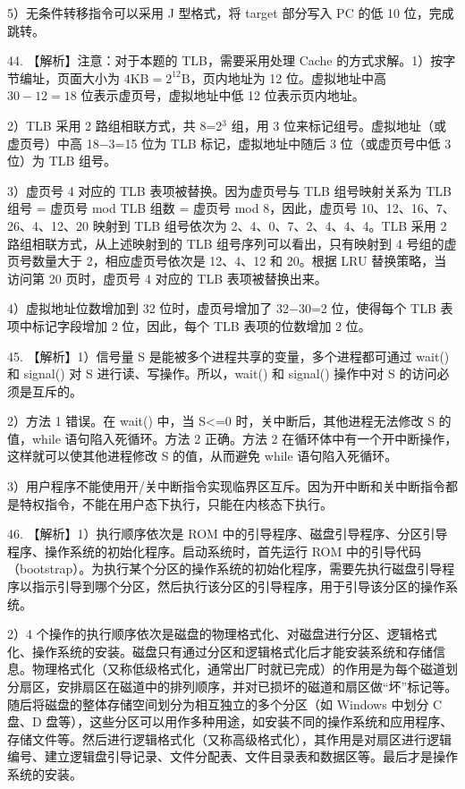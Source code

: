 \documentclass[UTF8,11pt]{ctexart}
\begin{document}
5）无条件转移指令可以采用 J 型格式，将 target 部分写入 PC 的低 10 位，完成跳转。


44. 【解析】注意：对于本题的 TLB，需要采用处理 Cache 的方式求解。1）按字节编址，页面大小为 \(\displaystyle 4\mathrm{KB}=2^{12}\mathrm{B}\)，页内地址为 12 位。虚拟地址中高 \(\displaystyle 30−12=18\) 位表示虚页号，虚拟地址中低 12 位表示页内地址。


2）TLB 采用 2 路组相联方式，共 8=2\(\displaystyle ^3\) 组，用 3 位来标记组号。虚拟地址（或虚页号）中高 18\(\displaystyle -\)3=15 位为 TLB 标记，虚拟地址中随后 3 位（或虚页号中低 3 位）为 TLB 组号。


3）虚页号 4 对应的 TLB 表项被替换。因为虚页号与 TLB 组号映射关系为 TLB 组号 = 虚页号 mod TLB 组数 = 虚页号 mod 8，因此，虚页号 10、12、16、7、26、4、12、20 映射到 TLB 组号依次为 2、4、0、7、2、4、4、4。TLB 采用 2 路组相联方式，从上述映射到的 TLB 组号序列可以看出，只有映射到 4 号组的虚页号数量大于 2，相应虚页号依次是 12、4、12 和 20。根据 LRU 替换策略，当访问第 20 页时，虚页号 4 对应的 TLB 表项被替换出来。


4）虚拟地址位数增加到 32 位时，虚页号增加了 32\(\displaystyle -\)30=2 位，使得每个 TLB 表项中标记字段增加 2 位，因此，每个 TLB 表项的位数增加 2 位。


45. 【解析】1）信号量 S 是能被多个进程共享的变量，多个进程都可通过 wait() 和 signal() 对 S 进行读、写操作。所以，wait() 和 signal() 操作中对 S 的访问必须是互斥的。


2）方法 1 错误。在 wait() 中，当 S<=0 时，关中断后，其他进程无法修改 S 的值，while 语句陷入死循环。方法 2 正确。方法 2 在循环体中有一个开中断操作，这样就可以使其他进程修改 S 的值，从而避免 while 语句陷入死循环。


3）用户程序不能使用开/关中断指令实现临界区互斥。因为开中断和关中断指令都是特权指令，不能在用户态下执行，只能在内核态下执行。


46. 【解析】1）执行顺序依次是 ROM 中的引导程序、磁盘引导程序、分区引导程序、操作系统的初始化程序。启动系统时，首先运行 ROM 中的引导代码（bootstrap）。为执行某个分区的操作系统的初始化程序，需要先执行磁盘引导程序以指示引导到哪个分区，然后执行该分区的引导程序，用于引导该分区的操作系统。


2）4 个操作的执行顺序依次是磁盘的物理格式化、对磁盘进行分区、逻辑格式化、操作系统的安装。磁盘只有通过分区和逻辑格式化后才能安装系统和存储信息。物理格式化（又称低级格式化，通常出厂时就已完成）的作用是为每个磁道划分扇区，安排扇区在磁道中的排列顺序，并对已损坏的磁道和扇区做“坏”标记等。随后将磁盘的整体存储空间划分为相互独立的多个分区（如 Windows 中划分 C 盘、D 盘等），这些分区可以用作多种用途，如安装不同的操作系统和应用程序、存储文件等。然后进行逻辑格式化（又称高级格式化），其作用是对扇区进行逻辑编号、建立逻辑盘引导记录、文件分配表、文件目录表和数据区等。最后才是操作系统的安装。
\end{document}
